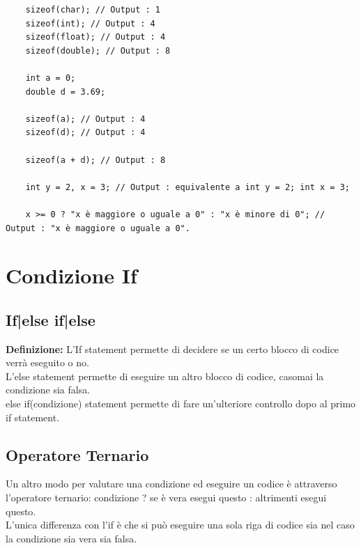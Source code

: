 \begin{lstlisting}
	sizeof(char); // Output : 1
	sizeof(int); // Output : 4
	sizeof(float); // Output : 4
	sizeof(double); // Output : 8
	
	int a = 0;
	double d = 3.69;
	
	sizeof(a); // Output : 4
	sizeof(d); // Output : 4
	
	sizeof(a + d); // Output : 8
	
	int y = 2, x = 3; // Output : equivalente a int y = 2; int x = 3;
	
	x >= 0 ? "x è maggiore o uguale a 0" : "x è minore di 0"; // Output : "x è maggiore o uguale a 0".
\end{lstlisting}


\newpage

\section{Condizione If}

\subsection{If|else if|else}

\textsf{\small \textbf{Definizione:} L'If statement permette di decidere se un certo blocco di codice verrà eseguito o no.} \\

\textsf{\small L'else statement permette di eseguire un altro blocco di codice, casomai la condizione sia falsa.} \\

\textsf{\small else if(condizione) statement permette di fare un'ulteriore controllo dopo al primo if statement. } \\

\subsection{Operatore Ternario}

\textsf{\small Un altro modo per valutare una condizione ed eseguire un codice è attraverso l'operatore ternario: condizione ? se è vera esegui questo : altrimenti esegui questo.} \\

\textsf{\small L'unica differenza con l'if è che si può eseguire una sola riga di codice sia nel caso la condizione sia vera sia falsa.} \\


